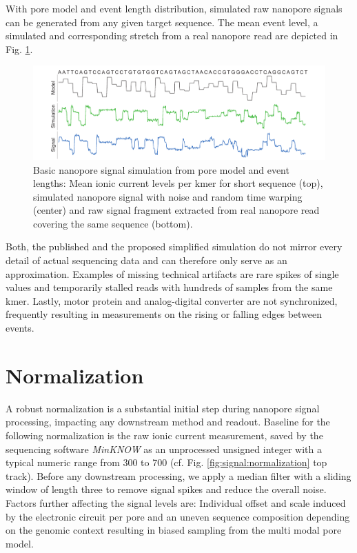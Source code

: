 With pore model and event length distribution, simulated raw nanopore signals can be generated from any given target sequence. The mean event level, a simulated and corresponding stretch from a real nanopore read are depicted in Fig. \ref{fig:signal:simulation}.

\begin{figure}[h]
	\centering
	\includegraphics[width=1.0\textwidth]{figures/signal/simulation.pdf}
	\captionsetup{format=plain}
	\caption[Basic signal simulation]{Basic nanopore signal simulation from pore model and event lengths: Mean ionic current levels per kmer for short sequence (top), simulated nanopore signal with noise and random time warping (center) and raw signal fragment extracted from real nanopore read covering the same sequence (bottom).}
	\label{fig:signal:simulation}
\end{figure}

Both, the published and the proposed simplified simulation do not mirror every detail of actual sequencing data and can therefore only serve as an approximation. Examples of missing technical artifacts are rare spikes of single values and temporarily stalled reads with hundreds of samples from the same kmer. Lastly, motor protein and analog-digital converter are not synchronized, frequently resulting in measurements on the rising or falling edges between events.




\section{Normalization}
\label{sec:signal:normalization}

A robust normalization is a substantial initial step during nanopore signal processing, impacting any downstream method and readout. Baseline for the following normalization is the raw ionic current measurement, saved by the sequencing software \textit{MinKNOW} as an unprocessed unsigned integer with a typical numeric range from 300 to 700 (cf. Fig. \ref{fig:signal:normalization} top track). Before any downstream processing, we apply a median filter with a sliding window of length three to remove signal spikes and reduce the overall noise. Factors further affecting the signal levels are: Individual offset and scale induced by the electronic circuit per pore and an uneven sequence composition depending on the genomic context resulting in biased sampling from the multi modal pore model.

